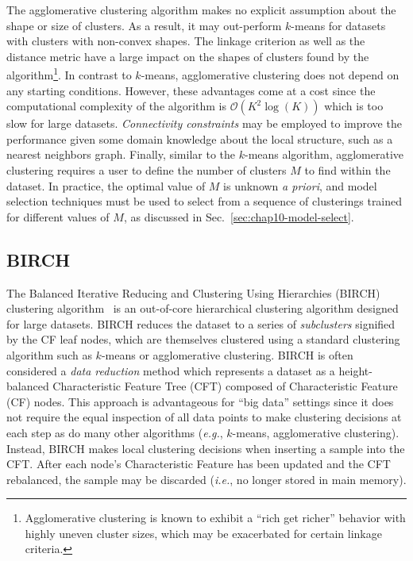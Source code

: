 The agglomerative clustering algorithm makes no explicit assumption about the shape or size of clusters. As a result, it may out-perform $k$-means for datasets with clusters with non-convex shapes. The linkage criterion as well as the distance metric have a large impact on the shapes of clusters found by the algorithm\footnote{Agglomerative clustering is known to exhibit a ``rich get richer'' behavior with highly uneven cluster sizes, which may be exacerbated for certain linkage criteria.}. In contrast to $k$-means, agglomerative clustering does not depend on any starting conditions. However, these advantages come at a cost since the computational complexity of the algorithm is $\mathcal{O}(K^{2}\log(K))$ which is too slow for large datasets. \textit{Connectivity constraints} may be employed to improve the performance given some domain knowledge about the local structure, such as a nearest neighbors graph. Finally, similar to the $k$-means algorithm, agglomerative clustering requires a user to define the number of clusters $M$ to find within the dataset. In practice, the optimal value of $M$ is unknown \textit{a priori}, and model selection techniques must be used to select from a sequence of clusterings trained for different values of $M$, as discussed in Sec.~\ref{sec:chap10-model-select}.

\subsection{BIRCH}
\label{subsec:chap10-birch}


The Balanced Iterative Reducing and Clustering Using Hierarchies (BIRCH) clustering algorithm~\cite{zhang1996birch} is an out-of-core hierarchical clustering algorithm designed for large datasets.
BIRCH reduces the dataset to a series of \textit{subclusters} signified by the CF leaf nodes, which are themselves clustered using a standard clustering algorithm such as $k$-means or agglomerative clustering.
BIRCH is often considered a \textit{data reduction} method which represents a dataset as a height-balanced Characteristic Feature Tree (CFT) composed of Characteristic Feature (CF) nodes. This approach is advantageous for ``big data'' settings since it does not require the equal inspection of all data points to make clustering decisions at each step as do many other algorithms (\textit{e.g.}, $k$-means, agglomerative clustering). Instead, BIRCH makes local clustering decisions when inserting a sample into the CFT. After each node's Characteristic Feature has been updated and the CFT rebalanced, the sample may be discarded (\textit{i.e.}, no longer stored in main memory). 

